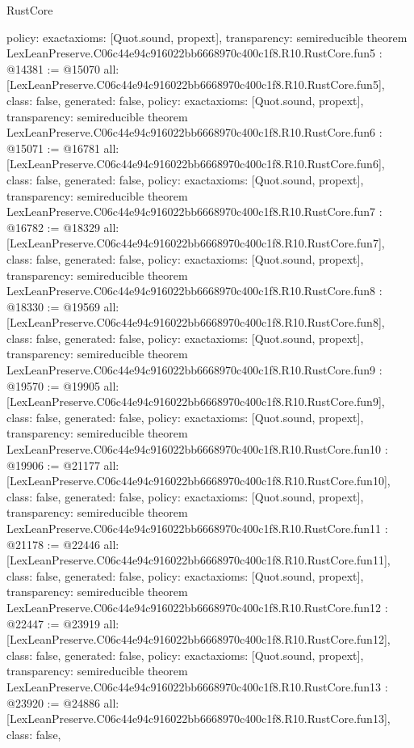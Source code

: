 \begin{lexlean}{RustCore}
\begin{coremodule}
{  policy: exact{axioms: [Quot.sound, propext]},
  transparency: semireducible
}
theorem LexLeanPreserve.C06c44e94c916022bb6668970c400c1f8.R10.RustCore.fun5 : @14381 := @15070 {
  all: [LexLeanPreserve.C06c44e94c916022bb6668970c400c1f8.R10.RustCore.fun5],
  class: false,
  generated: false,
  policy: exact{axioms: [Quot.sound, propext]},
  transparency: semireducible
}
theorem LexLeanPreserve.C06c44e94c916022bb6668970c400c1f8.R10.RustCore.fun6 : @15071 := @16781 {
  all: [LexLeanPreserve.C06c44e94c916022bb6668970c400c1f8.R10.RustCore.fun6],
  class: false,
  generated: false,
  policy: exact{axioms: [Quot.sound, propext]},
  transparency: semireducible
}
theorem LexLeanPreserve.C06c44e94c916022bb6668970c400c1f8.R10.RustCore.fun7 : @16782 := @18329 {
  all: [LexLeanPreserve.C06c44e94c916022bb6668970c400c1f8.R10.RustCore.fun7],
  class: false,
  generated: false,
  policy: exact{axioms: [Quot.sound, propext]},
  transparency: semireducible
}
theorem LexLeanPreserve.C06c44e94c916022bb6668970c400c1f8.R10.RustCore.fun8 : @18330 := @19569 {
  all: [LexLeanPreserve.C06c44e94c916022bb6668970c400c1f8.R10.RustCore.fun8],
  class: false,
  generated: false,
  policy: exact{axioms: [Quot.sound, propext]},
  transparency: semireducible
}
theorem LexLeanPreserve.C06c44e94c916022bb6668970c400c1f8.R10.RustCore.fun9 : @19570 := @19905 {
  all: [LexLeanPreserve.C06c44e94c916022bb6668970c400c1f8.R10.RustCore.fun9],
  class: false,
  generated: false,
  policy: exact{axioms: [Quot.sound, propext]},
  transparency: semireducible
}
theorem LexLeanPreserve.C06c44e94c916022bb6668970c400c1f8.R10.RustCore.fun10 : @19906 := @21177 {
  all: [LexLeanPreserve.C06c44e94c916022bb6668970c400c1f8.R10.RustCore.fun10],
  class: false,
  generated: false,
  policy: exact{axioms: [Quot.sound, propext]},
  transparency: semireducible
}
theorem LexLeanPreserve.C06c44e94c916022bb6668970c400c1f8.R10.RustCore.fun11 : @21178 := @22446 {
  all: [LexLeanPreserve.C06c44e94c916022bb6668970c400c1f8.R10.RustCore.fun11],
  class: false,
  generated: false,
  policy: exact{axioms: [Quot.sound, propext]},
  transparency: semireducible
}
theorem LexLeanPreserve.C06c44e94c916022bb6668970c400c1f8.R10.RustCore.fun12 : @22447 := @23919 {
  all: [LexLeanPreserve.C06c44e94c916022bb6668970c400c1f8.R10.RustCore.fun12],
  class: false,
  generated: false,
  policy: exact{axioms: [Quot.sound, propext]},
  transparency: semireducible
}
theorem LexLeanPreserve.C06c44e94c916022bb6668970c400c1f8.R10.RustCore.fun13 : @23920 := @24886 {
  all: [LexLeanPreserve.C06c44e94c916022bb6668970c400c1f8.R10.RustCore.fun13],
  class: false,
}
\end{coremodule}
\end{lexlean}

